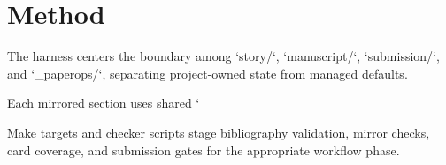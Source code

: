 \section{Method}

The harness centers the boundary among `story/`, `manuscript/`, `submission/`, and `_paperops/`, separating project-owned state from managed defaults.

Each mirrored section uses shared `%

Make targets and checker scripts stage bibliography validation, mirror checks, card coverage, and submission gates for the appropriate workflow phase.
